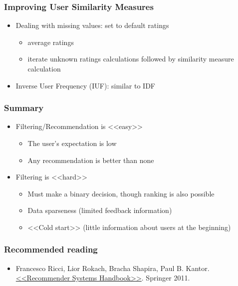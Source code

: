 \subsubsection{Improving User Similarity Measures}
\begin{itemize}
\item Dealing with missing values: set to default ratings
\begin{itemize}
\item average ratings
\item iterate unknown ratings calculations followed by similarity measure calculation
\end{itemize}

\item Inverse User Frequency (IUF): similar to IDF
\end{itemize}



\subsubsection{Summary}
\begin{itemize}
\item Filtering/Recommendation is <<easy>>
\begin{itemize}
\item The user’s expectation is low
\item Any recommendation is better than none
\end{itemize}

\item Filtering is <<hard>>
\begin{itemize}
\item Must make a binary decision, though ranking is also possible
\item Data sparseness (limited feedback information)
\item <<Cold start>> (little information about users at the beginning)
\end{itemize}
\end{itemize}



\subsubsection{Recommended reading}
\begin{itemize}
\item Francesco Ricci, Lior Rokach, Bracha Shapira, Paul B. Kantor. \href{http://www.cs.bme.hu/nagyadat/Recommender_systems_handbook.pdf}{<<Recommender Systems Handbook>>}. Springer 2011.
\end{itemize}
